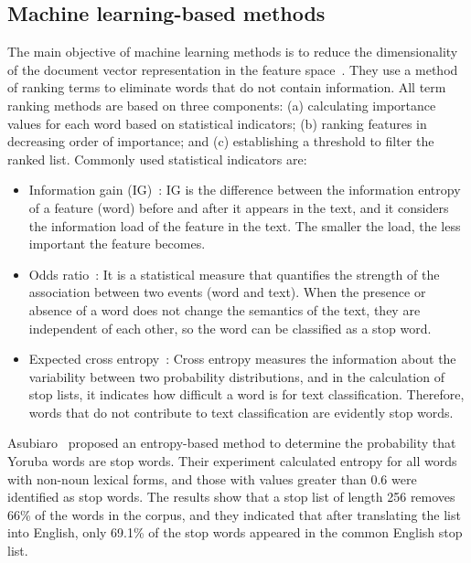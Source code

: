 \documentclass[conference]{IEEEtran}
\begin{document}
\begin{sloppy}
\subsection{Machine learning-based methods}
 
The main objective of machine learning methods is to reduce the dimensionality of the document vector representation in the feature space~\cite{aizawa2003information}. They use a method of ranking terms to eliminate words that do not contain information. All term ranking methods are based on three components: (a) calculating importance values for each word based on statistical indicators; (b) ranking features in decreasing order of importance; and (c) establishing a threshold to filter the ranked list. Commonly used statistical indicators are: 

\begin{itemize}
\item Information gain (IG)~\cite{yang1999re}: IG is the difference between the information entropy of a feature (word) before and after it appears in the text, and it considers the information load of the feature in the text. The smaller the load, the less important the feature becomes.  
\item Odds ratio~\cite{mladenic1998feature}: It is a statistical measure that quantifies the strength of the association between two events (word and text). When the presence or absence of a word does not change the semantics of the text, they are independent of each other, so the word can be classified as a stop word. 
\item Expected cross entropy~\cite{koller1997hierarchically}: Cross entropy measures the information about the variability between two probability distributions, and in the calculation of stop lists, it indicates how difficult a word is for text classification. Therefore, words that do not contribute to text classification are evidently stop words. 
\end{itemize}
 
Asubiaro~\cite{asubiaro2013entropy} proposed an entropy-based method to determine the probability that Yoruba words are stop words. Their experiment calculated entropy for all words with non-noun lexical forms, and those with values greater than 0.6 were identified as stop words. The results show that a stop list of length 256 removes 66\% of the words in the corpus, and they indicated that after translating the list into English, only 69.1\% of the stop words appeared in the common English stop list. 


\end{sloppy}
\end{document}
